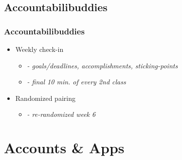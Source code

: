 \documentclass{beamer}
\begin{document}

\subsection{Accountabilibuddies}

\begin{frame}
  \frametitle{Accountabilibuddies}

  \begin{itemize}
    \item Weekly check-in
    \begin{itemize}
      \item[] \emph{- goals/deadlines, accomplishments, sticking-points}
      \item[] \emph{- final 10 min. of every 2nd class}
    \end{itemize}
    \item Randomized pairing
    \begin{itemize}
      \item[] \emph{- re-randomized week 6}
    \end{itemize}
  \end{itemize}

\end{frame}


\section{Accounts \& Apps}




\end{document}
